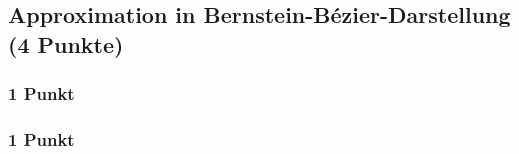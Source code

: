 \newif\ifvimbug
\vimbugfalse

\ifvimbug

\fi


\subsection{Approximation in Bernstein-Bézier-Darstellung (4 Punkte)}
\subsubsection{1 Punkt}
\subsubsection{1 Punkt}
\begin{center}
\end{center}


